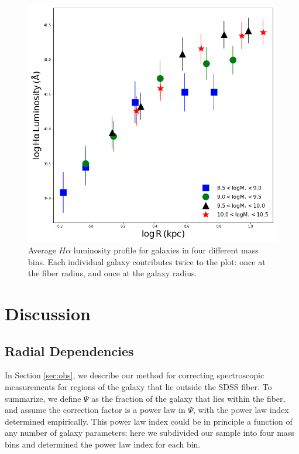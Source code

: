 \documentclass[iop]{emulateapj}
\begin{document}
\begin{figure}
	\centering
	\includegraphics[width= \columnwidth]{gradients_HA.png}
	\caption{Average $H\alpha$ luminosity profile for galaxies in four different mass bins. Each individual galaxy contributes twice to the plot: once at the fiber radius, and once at the galaxy radius.}
     \label{fig:grad_lum}

\end{figure}

\section{Discussion}
\label{(sec:discuss)}
\subsection{Radial Dependencies}

In Section \ref{sec:obs}, we describe our method for correcting spectroscopic measurements for regions of the galaxy that lie outside the SDSS fiber. To summarize, we define $\Psi$ as the fraction of the galaxy that lies within the fiber, and assume the correction factor is a power law in $\Psi$, with the power law index determined empirically. This power law index could be in principle a function of any number of galaxy parameters; here we subdivided our sample into four mass bins and determined the power law index for each bin.
\end{document}
